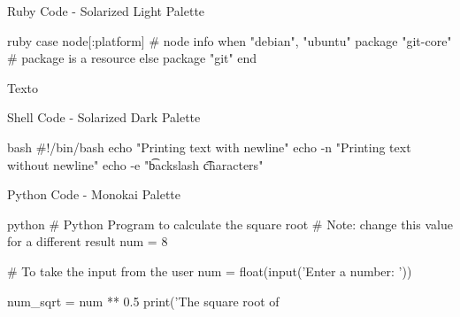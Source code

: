 \documentclass[aspectratio=169]{beamer} %
\begin{document}



\begin{SliTC}{Ruby Code - Solarized Light Palette}
    \begin{CodeL}{ruby}
case node[:platform] # node info
when "debian", "ubuntu"
  package "git-core" # package is a resource
else 
  package "git"
end
    \end{CodeL}
    Texto
\end{SliTC}

\begin{SliTC}{Shell Code - Solarized Dark Palette}
    \begin{CodeD2}{bash}
#!/bin/bash
echo "Printing text with newline"
echo -n "Printing text without newline"
echo -e "\nRemoving \t backslash \t characters\n"
    \end{CodeD2}
\end{SliTC}


\begin{SliTC}{Python Code - Monokai Palette}
    \begin{CodeD}{python}
# Python Program to calculate the square root
# Note: change this value for a different result
num = 8 

# To take the input from the user
num = float(input('Enter a number: '))

num_sqrt = num ** 0.5
print('The square root of %
    \end{CodeD}
\end{SliTC}
\end{document}
